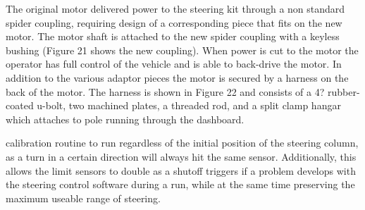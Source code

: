 The original motor delivered power to the steering kit through a non standard spider coupling, requiring design of a corresponding piece that fits on the new motor. The motor shaft is attached to the new spider coupling with a keyless bushing (Figure 21 shows the new coupling). When power is cut to the motor the operator has full control of the vehicle and is able
to back-drive the motor. In addition to the various adaptor pieces the motor is secured by a harness on the back of the motor. The harness is shown in Figure 22 and consists of a 4? rubber-coated u-bolt, two machined plates, a threaded rod, and a split clamp hangar which attaches to pole running through the dashboard.





\noindent calibration routine to run regardless of the initial position of the steering column, as a turn in a certain direction will always hit the same sensor. Additionally, this allows the limit sensors to double as a shutoff triggers if a problem develops with the steering control software during a run, while at the same time preserving the maximum useable range of steering.

